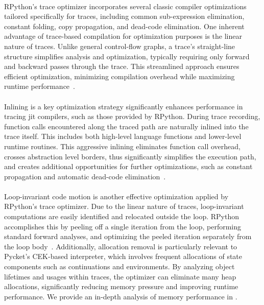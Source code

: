         \paragraph{}%
            RPython’s trace optimizer incorporates several classic compiler optimizations tailored specifically for traces, including common sub-expression elimination, constant folding, copy propagation, and dead-code elimination. One inherent advantage of trace-based compilation for optimization purposes is the linear nature of traces. Unlike general control-flow graphs, a trace's straight-line structure simplifies analysis and optimization, typically requiring only forward and backward passes through the trace. This streamlined approach ensures efficient optimization, minimizing compilation overhead while maximizing runtime performance~\cite{loop-aware:12}.

        \paragraph{}%
            Inlining is a key optimization strategy significantly enhances performance in tracing \gls{jit} compilers, such as those provided by RPython. During trace recording, function calls encountered along the traced path are naturally inlined into the trace itself. This includes both high-level language functions and lower-level runtime routines. This aggressive inlining eliminates function call overhead, crosses abstraction level borders, thus significantly simplifies the execution path, and creates additional opportunities for further optimizations, such as constant propagation and automatic dead-code elimination~\cite{gal:2006,pypy-main}.

        \paragraph{}%
            Loop-invariant code motion is another effective optimization applied by RPython’s trace optimizer. Due to the linear nature of traces, loop-invariant computations are easily identified and relocated outside the loop. RPython accomplishes this by peeling off a single iteration from the loop, performing standard forward analyses, and optimizing the peeled iteration separately from the loop body~\cite{loop-aware:12}. Additionally, allocation removal is particularly relevant to Pycket’s CEK-based interpreter, which involves frequent allocations of state components such as continuations and environments. By analyzing object lifetimes and usages within traces, the optimizer can eliminate many heap allocations, significantly reducing memory pressure and improving runtime performance. We provide an in-depth analysis of memory performance in .

